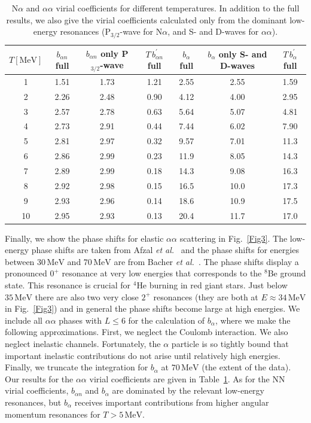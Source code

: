 \documentclass[aps,prc,twocolumn,showpacs,showkeys,amsmath,amssymb]{revtex4}
\newcommand{\mev}{\, \text{MeV}}
\begin{document}
\begin{table}[t]
\caption{N$\alpha$ and $\alpha\alpha$ virial coefficients for 
different temperatures. In addition to the full results, we also 
give the virial coefficients calculated only from the dominant
low-energy resonances (P$_{3/2}$-wave for N$\alpha$, and S- and D-waves 
for $\alpha\alpha$).}
\label{Table2}
\begin{ruledtabular}
\begin{tabular}{c|ccc|ccc}
$T [\text{MeV}]$ & $b_{\alpha n}$ full & $b_{\alpha n}$ only P$_{3/2}$-wave &
$T \, b_{\alpha n}^\prime$  full & $b_\alpha$ full & $b_\alpha$ only S-
and D-waves & $T \, b_\alpha^\prime$ full \\[0.5mm] \hline
1 & 1.51 & 1.73 & 1.21 & 2.55 & 2.55 & 1.59 \\[0.5mm]
2 & 2.26 & 2.48 & 0.90 & 4.12 & 4.00 & 2.95 \\[0.5mm]
3 & 2.57 & 2.78 & 0.63 & 5.64 & 5.07 & 4.81 \\[0.5mm]
4 & 2.73 & 2.91 & 0.44 & 7.44 & 6.02 & 7.90 \\[0.5mm]
5 & 2.81 & 2.97 & 0.32 & 9.57 & 7.01 & 11.3 \\[0.5mm]
6 & 2.86 & 2.99 & 0.23 & 11.9 & 8.05 & 14.3 \\[0.5mm]
7 & 2.89 & 2.99 & 0.18 & 14.3 & 9.08 & 16.3 \\[0.5mm]
8 & 2.92 & 2.98 & 0.15 & 16.5 & 10.0 & 17.3 \\[0.5mm]
9 & 2.93 & 2.96 & 0.14 & 18.6 & 10.9 & 17.5 \\[0.5mm]
10 & 2.95 & 2.93 & 0.13 & 20.4 & 11.7 & 17.0 \\[0.5mm]
\end{tabular} 
\end{ruledtabular}
\end{table}

Finally, we show the phase shifts for elastic $\alpha\alpha$ scattering
in Fig.~\ref{Fig3}.  The low-energy phase shifts are taken from Afzal 
{\it et al.}~\cite{alphalow} and the phase shifts for energies between 
$30 \mev$ and $70 \mev$ are from Bacher {\it et al.}~\cite{alphahigh}.
The phase shifts display a pronounced $0^+$ resonance at very low 
energies that corresponds to the $^8$Be ground state.  This resonance 
is crucial for $^4$He burning in red giant stars.  Just below $35 \mev$ 
there are also two very close $2^+$ resonances (they are both at
$E \approx 34 \mev$ in Fig.~\ref{Fig3}) and in general the phase 
shifts become large at high energies. We include all $\alpha\alpha$ phases 
with $L \leqslant 6$ for the calculation of $b_\alpha$, where we make the
following approximations.  First, we neglect the Coulomb interaction.  
We also neglect inelastic channels.  Fortunately, the $\alpha$ particle 
is so tightly bound that important inelastic contributions do not arise 
until relatively high energies.  Finally, we truncate the integration 
for $b_\alpha$ at $70 \mev$ (the extent of the data).
Our results for the $\alpha\alpha$ virial 
coefficients are given in Table~\ref{Table2}. As for the NN virial 
coefficients, $b_{\alpha n}$ and $b_\alpha$ are dominated by the relevant 
low-energy resonances, but $b_{\alpha}$ receives important contributions
from higher angular momentum resonances for $T > 5 \mev$.
\end{document}
